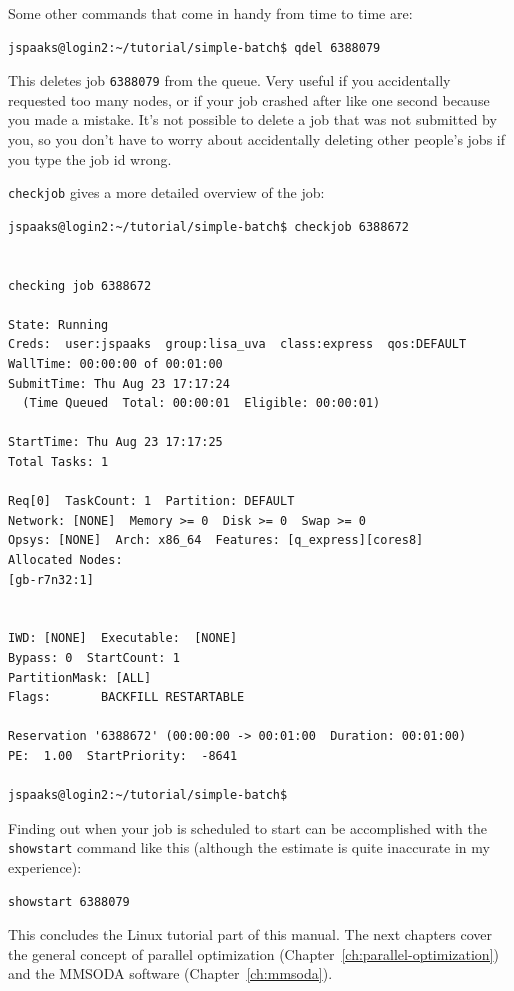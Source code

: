 Some other commands that come in handy from time to time are:
\begin{lstlisting}[style=basic,style=bash]
jspaaks@login2:~/tutorial/simple-batch$ qdel 6388079
\end{lstlisting}
This deletes job \lstinline[style=bashinline]{6388079} from the queue. Very useful if you accidentally requested too many nodes, or if your job crashed after like one second because you made a mistake. It's not possible to delete a job that was not submitted by you, so you don't have to worry about accidentally deleting other people's jobs if you type the job id wrong.

\vspace{1em}

\lstinline[style=bashinline]{checkjob} gives a more detailed overview of the job:
\begin{lstlisting}[style=basic,style=bash]
jspaaks@login2:~/tutorial/simple-batch$ checkjob 6388672


checking job 6388672

State: Running
Creds:  user:jspaaks  group:lisa_uva  class:express  qos:DEFAULT
WallTime: 00:00:00 of 00:01:00
SubmitTime: Thu Aug 23 17:17:24
  (Time Queued  Total: 00:00:01  Eligible: 00:00:01)

StartTime: Thu Aug 23 17:17:25
Total Tasks: 1

Req[0]  TaskCount: 1  Partition: DEFAULT
Network: [NONE]  Memory >= 0  Disk >= 0  Swap >= 0
Opsys: [NONE]  Arch: x86_64  Features: [q_express][cores8]
Allocated Nodes:
[gb-r7n32:1]


IWD: [NONE]  Executable:  [NONE]
Bypass: 0  StartCount: 1
PartitionMask: [ALL]
Flags:       BACKFILL RESTARTABLE

Reservation '6388672' (00:00:00 -> 00:01:00  Duration: 00:01:00)
PE:  1.00  StartPriority:  -8641

jspaaks@login2:~/tutorial/simple-batch$
\end{lstlisting}

Finding out when your job is scheduled to start can be accomplished with the \texttt{showstart} command like this (although the estimate is quite inaccurate in my experience):
\begin{lstlisting}[style=basic,style=bash]
showstart 6388079
\end{lstlisting}

This concludes the Linux tutorial part of this manual. The next chapters cover the general concept of parallel optimization (Chapter~\ref{ch:parallel-optimization}) and the MMSODA software (Chapter~\ref{ch:mmsoda}).

